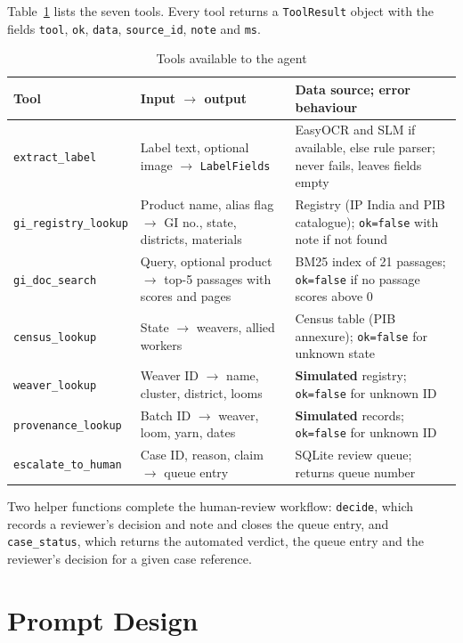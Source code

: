 Table~\ref{tab:tools} lists the seven tools. Every tool returns a \texttt{ToolResult} object with the
fields \texttt{tool}, \texttt{ok}, \texttt{data}, \texttt{source\_id}, \texttt{note} and \texttt{ms}.

\begin{table}[H]
\centering
\caption{Tools available to the agent}
\label{tab:tools}
\small
\begin{tabularx}{\linewidth}{@{}>{\raggedright\arraybackslash}p{3.1cm} >{\raggedright\arraybackslash}p{4.1cm} >{\raggedright\arraybackslash}X@{}}
\toprule
\textbf{Tool} & \textbf{Input $\rightarrow$ output} & \textbf{Data source; error behaviour} \\ \midrule
\texttt{extract\_label} & Label text, optional image $\rightarrow$ \texttt{LabelFields} & EasyOCR and SLM if available, else rule parser; never fails, leaves fields empty \\
\texttt{gi\_registry\_lookup} & Product name, alias flag $\rightarrow$ GI no., state, districts, materials & Registry (IP India and PIB catalogue); \texttt{ok=false} with note if not found \\
\texttt{gi\_doc\_search} & Query, optional product $\rightarrow$ top-5 passages with scores and pages & BM25 index of 21 passages; \texttt{ok=false} if no passage scores above 0 \\
\texttt{census\_lookup} & State $\rightarrow$ weavers, allied workers & Census table (PIB annexure); \texttt{ok=false} for unknown state \\
\texttt{weaver\_lookup} & Weaver ID $\rightarrow$ name, cluster, district, looms & \textbf{Simulated} registry; \texttt{ok=false} for unknown ID \\
\texttt{provenance\_lookup} & Batch ID $\rightarrow$ weaver, loom, yarn, dates & \textbf{Simulated} records; \texttt{ok=false} for unknown ID \\
\texttt{escalate\_to\_human} & Case ID, reason, claim $\rightarrow$ queue entry & SQLite review queue; returns queue number \\
\bottomrule
\end{tabularx}
\end{table}

Two helper functions complete the human-review workflow: \texttt{decide}, which records a reviewer's
decision and note and closes the queue entry, and \texttt{case\_status}, which returns the automated
verdict, the queue entry and the reviewer's decision for a given case reference.

\section{Prompt Design}

